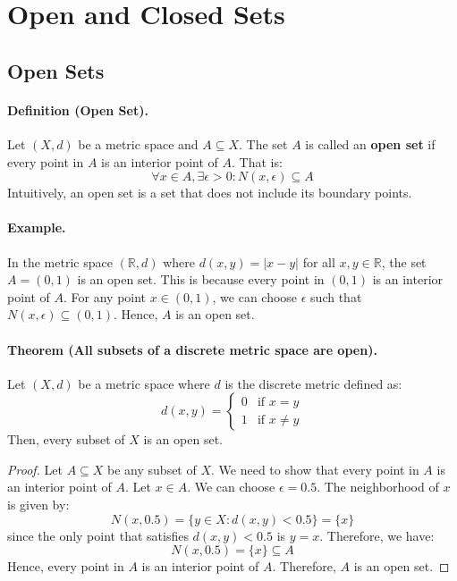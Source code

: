 \documentclass[openany]{book}
\numberwithin{equation}{section}
\begin{document}
\section{Open and Closed Sets}
\subsection{Open Sets}
\paragraph{Definition (Open Set).}

    Let $(X, d)$ be a metric space and $A \subseteq X$. The set $A$ is called an \textbf{open set} if every point in $A$ is an interior point of $A$. That is:
    $$\forall x \in A, \exists \epsilon > 0: N(x, \epsilon) \subseteq A$$
    Intuitively, an open set is a set that does not include its boundary points.
\par
\paragraph{Example.}

    In the metric space $(\mathbb{R}, d)$ where $d(x, y) = |x - y|$ for all $x, y \in \mathbb{R}$, the set $A = (0, 1)$ is an open set. This is because every point in $(0, 1)$ is an interior point of $A$. For any point $x \in (0, 1)$, we can choose $\epsilon$ such that $N(x, \epsilon) \subseteq (0, 1)$. Hence, $A$ is an open set.
\par
\paragraph{Theorem (All subsets of a discrete metric space are open).}

    Let $(X, d)$ be a metric space where $d$ is the discrete metric defined as:
    $$d(x, y) = 
    \begin{cases}
        0 & \text{if } x = y \\
        1 & \text{if } x \neq y
    \end{cases}$$
    Then, every subset of $X$ is an open set.
\par
\begin{proof}
    Let $A \subseteq X$ be any subset of $X$. We need to show that every point in $A$ is an interior point of $A$. Let $x \in A$. We can choose $\epsilon = 0.5$. The neighborhood of $x$ is given by:
    $$N(x, 0.5) = \{y \in X: d(x, y) < 0.5\} = \{x\}$$
    since the only point that satisfies $d(x, y) < 0.5$ is $y = x$. Therefore, we have:
    $$N(x, 0.5) = \{x\} \subseteq A$$
    Hence, every point in $A$ is an interior point of $A$. Therefore, $A$ is an open set.
\end{proof}
\end{document}
